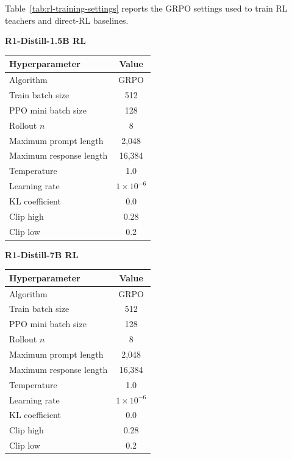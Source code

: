 Table~\ref{tab:rl-training-settings} reports the GRPO settings used to train
RL teachers and direct-RL baselines.

\begin{table}[H]
\centering
\small
\setlength{\tabcolsep}{4.5pt}
\renewcommand{\arraystretch}{1.06}
\begin{minipage}[t]{0.48\linewidth}
\centering
\textbf{R1-Distill-1.5B RL}\\[3pt]
\begin{tabular}{lc}
\toprule
Hyperparameter & Value \\
\midrule
Algorithm & GRPO \\
Train batch size & 512 \\
PPO mini batch size & 128 \\
Rollout $n$ & 8 \\
Maximum prompt length & 2,048 \\
Maximum response length & 16,384 \\
Temperature & 1.0 \\
Learning rate & $1\times10^{-6}$ \\
KL coefficient & 0.0 \\
Clip high & 0.28 \\
Clip low & 0.2 \\
\bottomrule
\end{tabular}
\end{minipage}\hfill
\begin{minipage}[t]{0.48\linewidth}
\centering
\textbf{R1-Distill-7B RL}\\[3pt]
\begin{tabular}{lc}
\toprule
Hyperparameter & Value \\
\midrule
Algorithm & GRPO \\
Train batch size & 512 \\
PPO mini batch size & 128 \\
Rollout $n$ & 8 \\
Maximum prompt length & 2,048 \\
Maximum response length & 16,384 \\
Temperature & 1.0 \\
Learning rate & $1\times10^{-6}$ \\
KL coefficient & 0.0 \\
Clip high & 0.28 \\
Clip low & 0.2 \\
\bottomrule
\end{tabular}
\end{minipage}


\end{table}
